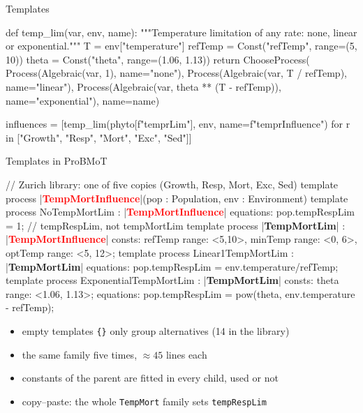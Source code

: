 \documentclass[14pt,aspectratio=169]{beamer}
\begin{document}
\begin{frame}[fragile]{Templates}
    \begin{code}[python][\scriptsize]
def temp_lim(var, env, name):
    """Temperature limitation of any rate: none, linear or exponential."""
    T = env["temperature"]
    refTemp = Const("refTemp", range=(5, 10))
    theta = Const("theta", range=(1.06, 1.13))
    return ChooseProcess(
        Process(Algebraic(var, 1), name="none"),
        Process(Algebraic(var, T / refTemp), name="linear"),
        Process(Algebraic(var, theta ** (T - refTemp)), name="exponential"),
        name=name)

influences = [temp_lim(phyto[f"temp{r}Lim"], env, name=f"temp{r}Influence")
              for r in ["Growth", "Resp", "Mort", "Exc", "Sed"]]
    \end{code}
    \footnotesize
\end{frame}
\begin{frame}[fragile]{Templates in ProBMoT}
    \begin{code}[text][\scriptsize][escapeinside=||]
// Zurich library: one of five copies (Growth, Resp, Mort, Exc, Sed)
template process |\textcolor{red}{\textbf{TempMortInfluence}}|(pop : Population, env : Environment) {}
template process NoTempMortLim : |\textcolor{red}{\textbf{TempMortInfluence}}| {
  equations: pop.tempRespLim = 1; }   // tempRespLim, not tempMortLim
template process |\textcolor{title_color}{\textbf{TempMortLim}}| : |\textcolor{red}{\textbf{TempMortInfluence}}| {
  consts: refTemp {range: <5,10>}, minTemp {range: <0, 6>},
          optTemp {range: <5, 12>}; }
template process Linear1TempMortLim : |\textcolor{title_color}{\textbf{TempMortLim}}| {
  equations: pop.tempRespLim = env.temperature/refTemp; }
template process ExponentialTempMortLim : |\textcolor{title_color}{\textbf{TempMortLim}}| {
  consts: theta {range: <1.06, 1.13>};
  equations: pop.tempRespLim = pow(theta, env.temperature - refTemp); }
    \end{code}
    \footnotesize
    \begin{itemize}
        \setlength{\itemsep}{0.3ex}
        \item empty templates \texttt{\{\}} only group alternatives (14 in the library)
        \item the same family five times, $\approx 45$ lines each
        \item constants of the parent are fitted in every child, used or not
        \item copy--paste: the whole \texttt{TempMort} family sets \texttt{tempRespLim}
    \end{itemize}
\end{frame}
\end{document}
